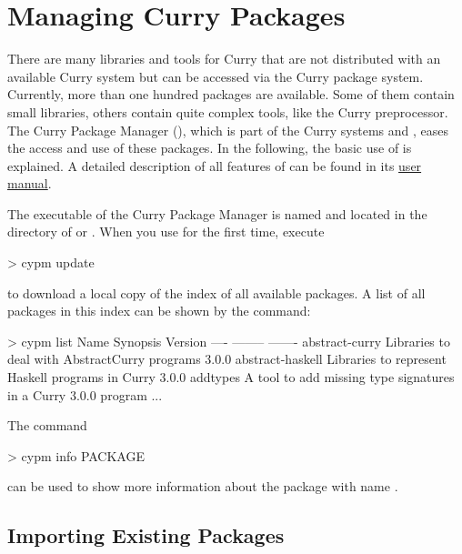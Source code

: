 \chapter{Managing Curry Packages}

There are many libraries and tools for Curry
that are not distributed with an available Curry system
but can be accessed via the Curry package system.
Currently, more than one hundred packages are
available.
Some of them contain small libraries, others
contain quite complex tools, like the Curry preprocessor.
The Curry Package Manager (\cpm),
which is part of the Curry systems \pakcs and \kics,
eases the access and use of these packages.
In the following, the basic use of \cpm is explained.
A detailed description of all features of \cpm
can be found in its
\href{http://curry-language.org/tools/cpm}{user manual}.

The executable of the Curry Package Manager is named 
and located in the  directory of \pakcs or \kics.
When you use \cpm for the first time, execute
%
\begin{curry}
> cypm update
\end{curry}
%
to download a local copy of the index of all available packages.
A list of all packages in this index can be shown by
the  command:
%
\begin{curry}
> cypm list
Name             Synopsis                                         Version   
----             --------                                         -------   
abstract-curry   Libraries to deal with AbstractCurry programs     3.0.0     
abstract-haskell Libraries to represent Haskell programs in Curry  3.0.0     
addtypes         A tool to add missing type signatures in a Curry  3.0.0     
                 program                                           
...
\end{curry}
%
The command
%
\begin{curry}
> cypm info PACKAGE
\end{curry}
%
can be used to show more information about the package with name
.

\section{Importing Existing Packages}
\label{sec:importing-packages}

